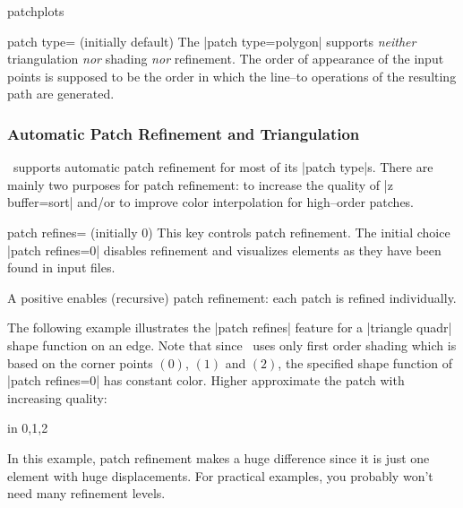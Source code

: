 \begin{pgfplotslibrary}{patchplots}
\begin{pgfplotskey}{patch type= (initially default)}
	The |patch type=polygon| supports \emph{neither} triangulation \emph{nor} shading \emph{nor} refinement. The order of appearance of the input points is supposed to be the order in which the line--to operations of the resulting path are generated.

\end{pgfplotskey}



\subsubsection{Automatic Patch Refinement and Triangulation}
\PGFPlots\ supports automatic patch refinement for most of its |patch type|s. There are mainly two purposes for patch refinement: to increase the quality of |z buffer=sort| and/or to improve color interpolation for high--order patches. 

\begin{pgfplotskey}{patch refines= (initially 0)}
	This key controls patch refinement. The initial choice |patch refines=0| disables refinement and visualizes elements as they have been found in input files.

	A positive  enables (recursive) patch refinement: each patch is refined individually. 

	The following example illustrates the |patch refines| feature for a |triangle quadr| shape function on an edge. Note that since \PGFPlots\ uses only first order shading which is based on the corner points $(0)$, $(1)$ and $(2)$, the specified shape function of |patch refines=0| has constant color. Higher  approximate the patch with increasing quality:
\begin{codeexample}[]
\foreach \level in {0,1,2} {%
}
\end{codeexample}
	\noindent In this example, patch refinement makes a huge difference since it is just one element with huge displacements. For practical examples, you probably won't need many refinement levels.
	

\end{pgfplotskey}
\end{pgfplotslibrary}
